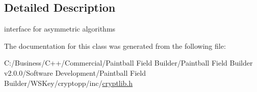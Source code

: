 \subsection{Detailed Description}
interface for asymmetric algorithms 

The documentation for this class was generated from the following file:\begin{DoxyCompactItemize}
\item 
C:/Business/C++/Commercial/Paintball Field Builder/Paintball Field Builder v2.0.0/Software Development/Paintball Field Builder/WSKey/cryptopp/inc/\hyperlink{cryptlib_8h}{cryptlib.h}\end{DoxyCompactItemize}
